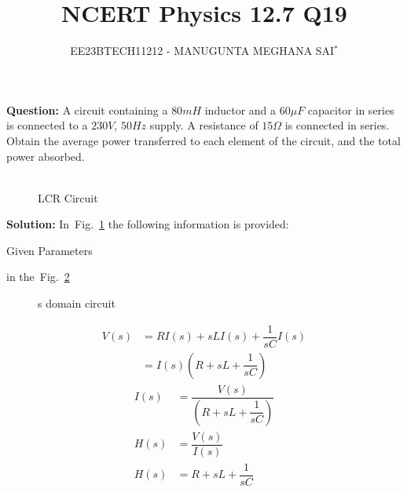 \documentclass[journal,12pt,onecolumn]{IEEEtran}
\title{
	
\title{NCERT Physics 12.7 Q19}
\author{EE23BTECH11212 - MANUGUNTA MEGHANA SAI$^{*}$%
}


}
\newcommand\figref{Fig.~\ref}
\theoremstyle{remark}
\begin{document}
\maketitle

\textbf{Question:} 
A circuit containing a $80 mH$ inductor and a $60 \mu F$ capacitor in series is connected to a $230 V$, $50 Hz$ supply. A resistance of $15 \Omega $ is connected in series. Obtain the average power transferred to each element of the circuit, and the total power absorbed.\\
\\

\begin{figure}[h]
	\centering
	
	\caption{LCR Circuit}
	\label{fig:2}
\end{figure}
     
\textbf{Solution: }
In~\figref{fig:2} the following information is provided:
 
 

 \begin{table}[h!]
 	\centering
 	\resizebox{6 cm}{!}{
 		
 	}
 	\caption{Given Parameters}
 	\label{tab:my_label} 
 \end{table} 
  in the~\figref{fig:1}
 
 \begin{figure}[!h]
 	\centering
 	
 	\caption{s domain circuit}
 	\label{fig:1}
 	
 \end{figure}
 \begin{align}
 	V(s) &= R I(s) + sL I(s) + \dfrac{1}{sC} I(s)\\
         &= I(s)\left(R + sL + \dfrac{1}{sC}\right)
 \end{align}
\begin{align}
    I(s) &= \dfrac{V(s)}{\left(R + sL + \dfrac{1}{sC}\right)}\\ 
    H(s) &= \dfrac{V(s)}{I(s)}\\
	H(s) &= R + sL + \dfrac{1}{sC}
\end{align}
\end{document}

